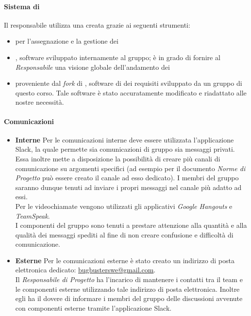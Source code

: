 \paragraph*{Sistema di }Il responsabile utilizza una  creata grazie ai seguenti strumenti:
\begin{itemize}

\item {} per l'assegnazione e la gestione dei 
\item {}, software sviluppato internamente al gruppo; è in grado di fornire al \textit{Responsabile} una visione globale dell'andamento dei 
\item {}  proveniente dal \textit{fork} di , software di  dei requisiti sviluppato da un gruppo di questo corso. Tale software è stato accuratamente modificato e riadattato alle nostre necessità.
\end{itemize}

\paragraph*{Comunicazioni} 
\begin{itemize}
	\item \textbf{Interne} 
	Per le comunicazioni interne deve essere utilizzata l'applicazione Slack, la quale permette sia comunicazioni di gruppo sia messaggi
	privati. Essa inoltre mette a disposizione la possibilità di creare più canali di comunicazione su argomenti specifici (ad esempio per il documento 
	\textit{Norme di Progetto} può essere creato il canale ad esso dedicato). I membri del gruppo saranno dunque tenuti ad inviare i propri messaggi
	nel canale più adatto ad essi. \\
	Per le videochiamate vengono utilizzati gli applicativi \textit{Google Hangouts} e \textit{TeamSpeak}. \\
	I componenti del gruppo sono tenuti a prestare attenzione alla quantità e alla qualità dei messaggi spediti al fine 
	di non creare confusione e difficoltà di comunicazione. \\
	\item \textbf{Esterne}
	Per le comunicazioni esterne è stato creato un indirizzo di posta elettronica dedicato: \href{mailto:me@somewhere.com}{bugbusterswe@gmail.com}. \\
	Il \textit{Responsabile di Progetto} ha l'incarico di mantenere i contatti tra il team e le componenti esterne utilizzando 
	tale indirizzo di posta elettronica. Inoltre egli ha il dovere di informare i membri del gruppo delle discussioni avvenute con
	componenti esterne tramite l'applicazione Slack.
\end{itemize}


